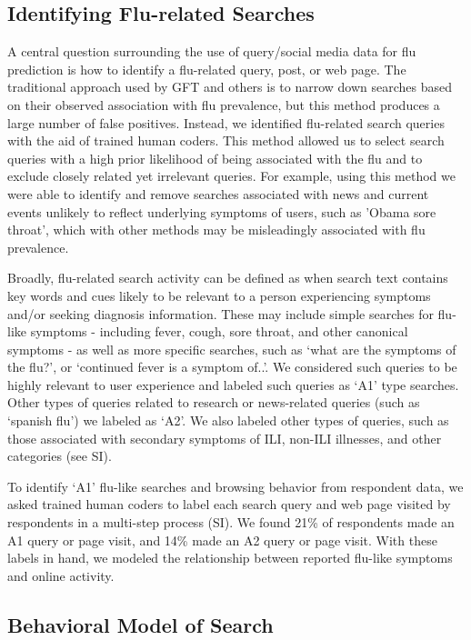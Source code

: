 \documentclass[fleqn,10pt]{wlscirep}
\providecommand{\DIFadd}[1]{{\protect\color{blue}\uwave{#1}}} %
\providecommand{\DIFaddbegin}{} %
\providecommand{\DIFaddend}{} %
\begin{document}
\subsection*{Identifying Flu-related Searches}

A central question surrounding the use of query/social media data for flu prediction is how to identify a flu-related query, post, or web page. The traditional approach used by GFT and others is to narrow down searches based on their observed association with flu prevalence, but this method produces a large number of false positives. Instead, we identified flu-related search queries with the aid of trained human coders. This method allowed us to select search queries with a high prior likelihood of being associated with the flu and to exclude closely related yet irrelevant queries. For example, using this method we were able to identify and remove searches associated with news and current events unlikely to reflect underlying symptoms of users, such as 'Obama sore throat', which with other methods may be misleadingly associated with flu prevalence. 
\DIFaddbegin 

\DIFaddend Broadly, flu-related search activity can be defined as when search text contains key words and cues likely to be relevant to a person experiencing symptoms and/or seeking diagnosis information. These may include simple searches for flu-like symptoms - including fever, cough, sore throat, and other canonical symptoms - as well as more specific searches, such as `what are the symptoms of the flu?', or `continued fever is a symptom of..'. We considered such queries to be highly relevant to user experience and labeled such queries as `A1' type searches. Other types of queries related to research or news-related queries (such as `spanish flu') we labeled as `A2'. We also labeled other types of queries, such as those associated with secondary symptoms of ILI, non-ILI illnesses, and other categories (see SI\DIFaddbegin \DIFadd{:5.2}\DIFaddend ). 

To identify `A1' flu-like searches and browsing behavior from respondent data, we asked trained human coders to label each search query and web page visited by respondents in a multi-step process (SI\DIFaddbegin \DIFadd{: 5.4}\DIFaddend ). We found 21\% of respondents made an A1 query or page visit, and 14\% made an A2 query or page visit. With these labels in hand, we modeled the relationship between reported flu-like symptoms and online activity.

\subsection*{Behavioral Model of Search}
\end{document}
